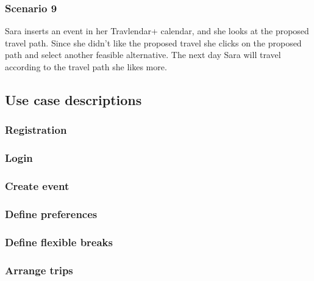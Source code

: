 	\subsubsection{Scenario 9}
		Sara inserts an event in her Travlendar+ calendar, and she looks at the proposed travel path. Since she didn't like the proposed travel she clicks on the proposed path and select another feasible alternative. The next day Sara will travel according to the travel path she likes more.	
	
\subsection{Use case descriptions}
\label{subsect:Use case descriptions}

	\subsubsection{Registration}
		
		
	\subsubsection{Login}
		
		
	\subsubsection{Create event}
		
		
	\subsubsection{Define preferences}
		
		
	\subsubsection{Define flexible breaks}
			
		
	\subsubsection{Arrange trips}
			
		
